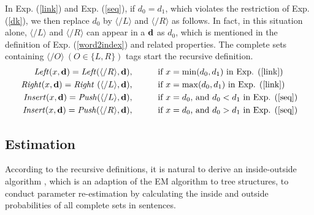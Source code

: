 \documentclass[english]{jnlp_1.4}
\begin{document}
In Exp. (\ref{link}) and Exp. (\ref{seq}), if $d_0 = d_1$, which violates the restriction of Exp. (\ref{dk}), we then replace $d_0$ by $\langle \slash L \rangle$ and $\langle \slash R \rangle$ as follows. In fact, in this situation alone, $\langle \slash L \rangle$ and $\langle \slash R \rangle$ can appear in a ${\bf{d}}$ as $d_0$, which is mentioned in the definition of Exp. (\ref{word2index}) and related properties. The complete sets containing $\langle \slash O \rangle\ (O \in \{L, R\})$ tags start the recursive definition.
\begin{align}
\label{slashbegin}
\mathit{Left} (x, {\bf{d}}) = \mathit{Left} (\langle \slash R \rangle, {\bf{d}}),&
\indent \indent \text{if $x=\min(d_0, d_1)$ in Exp. (\ref{link})}
\\
\mathit{Right} (x, {\bf{d}}) = \mathit{Right} \ (\langle \slash L \rangle, {\bf{d}}),&
\indent \indent \text{if $x=\max(d_0, d_1)$ in Exp. (\ref{link})}
\\
\mathit{Insert} (x, {\bf{d}}) = \mathit{Push} (\langle \slash L \rangle, {\bf{d}}),&
\indent \indent \text{if $x=d_0$, and $d_0 < d_1$ in Exp. (\ref{seq})}
\\
\label{slashend}
\mathit{Insert} (x, {\bf{d}}) = \mathit{Push} (\langle \slash R \rangle, {\bf{d}}),&
\indent \indent \text{if $x=d_0$, and $d_0 > d_1$ in Exp. (\ref{seq})}
\end{align}


\subsection{Estimation}
\label{sec:estimation}

According to the recursive definitions, it is natural to derive an inside-outside algorithm \cite{lari1990estimation}, which is an adaption of the EM algorithm \cite{dempster1977} to tree structures, to conduct parameter re-estimation by calculating the inside and outside probabilities of all complete sets in sentences.
\end{document}
